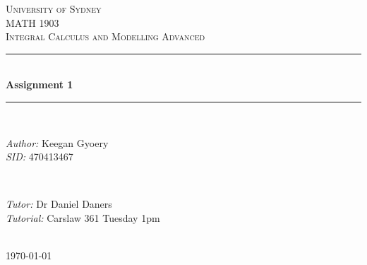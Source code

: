 \documentclass[a4paper]{article}
\begin{document}
\begin{titlepage}

\newcommand{\HRule}{\rule{\linewidth}{0.5mm}} %

\center %
 
\textsc{\LARGE University of Sydney}\\[1.5cm] %
\textsc{\Large MATH 1903}\\[0.5cm] %
\textsc{\large Integral Calculus and Modelling Advanced}\\[0.5cm] %

\HRule \\[0.4cm]
{ \huge \bfseries Assignment 1}\\[0.4cm] %
\HRule \\[1.5cm]

\begin{minipage}{0.4\textwidth}
\begin{flushleft} \large
\emph{Author:}
Keegan Gyoery %
\\
\emph{SID:}
470413467
\end{flushleft}
\end{minipage}
~
\begin{minipage}{0.4\textwidth}
\begin{flushright} \large
\emph{Tutor:} 
Dr Daniel Daners %
\\
\emph{Tutorial:}
Carslaw 361
Tuesday 1pm
\end{flushright}
\end{minipage}\\[4cm]

{\large \today}\\[3cm] %

\vfill %

\end{titlepage}

\end{document}
